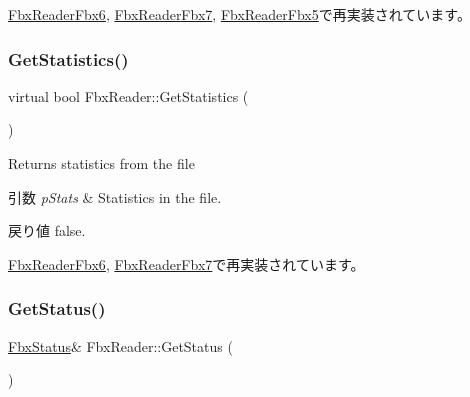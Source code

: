 \hyperlink{class_fbx_reader_fbx6_a62e8d566653eccca7e4b7c914f7a9a5e}{Fbx\+Reader\+Fbx6}, \hyperlink{class_fbx_reader_fbx7_a9079add7d3edeb7af9378ae3a19fec35}{Fbx\+Reader\+Fbx7}, \hyperlink{class_fbx_reader_fbx5_af685112183765e2a278bbbc898374074}{Fbx\+Reader\+Fbx5}で再実装されています。

\mbox{\label{class_fbx_reader_ae14762357b4a8ecce10a266b06cc3117}} 
\subsubsection{\texorpdfstring{Get\+Statistics()}{GetStatistics()}}
{\footnotesize\ttfamily virtual bool Fbx\+Reader\+::\+Get\+Statistics (\begin{DoxyParamCaption}\item[{\hyperlink{class_fbx_statistics}{Fbx\+Statistics} $\ast$}]{ }\end{DoxyParamCaption})\hspace{0.3cm}{\ttfamily [virtual]}}

Returns statistics from the file 
\begin{DoxyParams}{引数}
{\em p\+Stats} & Statistics in the file. \\
\hline
\end{DoxyParams}
\begin{DoxyReturn}{戻り値}
{\ttfamily false}. 
\end{DoxyReturn}


\hyperlink{class_fbx_reader_fbx6_a72865fb347314f30b81b56767fe91a5b}{Fbx\+Reader\+Fbx6}, \hyperlink{class_fbx_reader_fbx7_a674cd0632a4d854d8a7dceb51179e8c9}{Fbx\+Reader\+Fbx7}で再実装されています。

\mbox{\label{class_fbx_reader_a7462b93f063eac16b6dd2516c4c3d2f1}} 
\subsubsection{\texorpdfstring{Get\+Status()}{GetStatus()}}
{\footnotesize\ttfamily \hyperlink{class_fbx_status}{Fbx\+Status}\& Fbx\+Reader\+::\+Get\+Status (\begin{DoxyParamCaption}{ }\end{DoxyParamCaption})}

